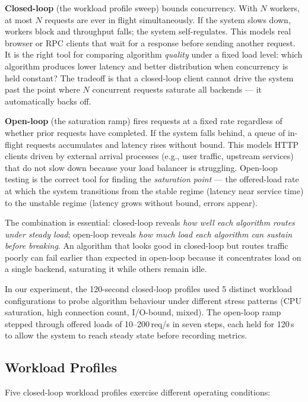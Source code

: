 \documentclass[12pt]{article}
\begin{document}
\textbf{Closed-loop} (the workload profile sweep) bounds concurrency.
With $N$ workers, at most $N$ requests are ever in flight simultaneously.
If the system slows down, workers block and throughput falls; the system
self-regulates. This models real browser or RPC clients that wait for a
response before sending another request. It is the right tool for comparing
algorithm \emph{quality} under a fixed load level: which algorithm produces
lower latency and better distribution when concurrency is held constant?
The tradeoff is that a closed-loop client cannot drive the system past the
point where $N$ concurrent requests saturate all backends --- it automatically
backs off.

\textbf{Open-loop} (the saturation ramp) fires requests at a fixed rate
regardless of whether prior requests have completed. If the system falls
behind, a queue of in-flight requests accumulates and latency rises without
bound. This models HTTP clients driven by external arrival processes
(e.g., user traffic, upstream services) that do not slow down because your
load balancer is struggling. Open-loop testing is the correct tool for
finding the \emph{saturation point} --- the offered-load rate at which the
system transitions from the stable regime (latency near service time) to the
unstable regime (latency grows without bound, errors appear).

The combination is essential: closed-loop reveals \emph{how well each
algorithm routes under steady load}; open-loop reveals \emph{how much load
each algorithm can sustain before breaking}. An algorithm that looks good in
closed-loop but routes traffic poorly can fail earlier than expected in
open-loop because it concentrates load on a single backend, saturating it
while others remain idle.

In our experiment, the 120-second closed-loop profiles used 5 distinct
workload configurations to probe algorithm behaviour under different
stress patterns (CPU saturation, high connection count, I/O-bound, mixed).
The open-loop ramp stepped through offered loads of 10--200\,req/s in
seven steps, each held for 120\,s to allow the system to reach steady state
before recording metrics.

\subsection{Workload Profiles}

Five closed-loop workload profiles exercise different operating conditions:
\end{document}
